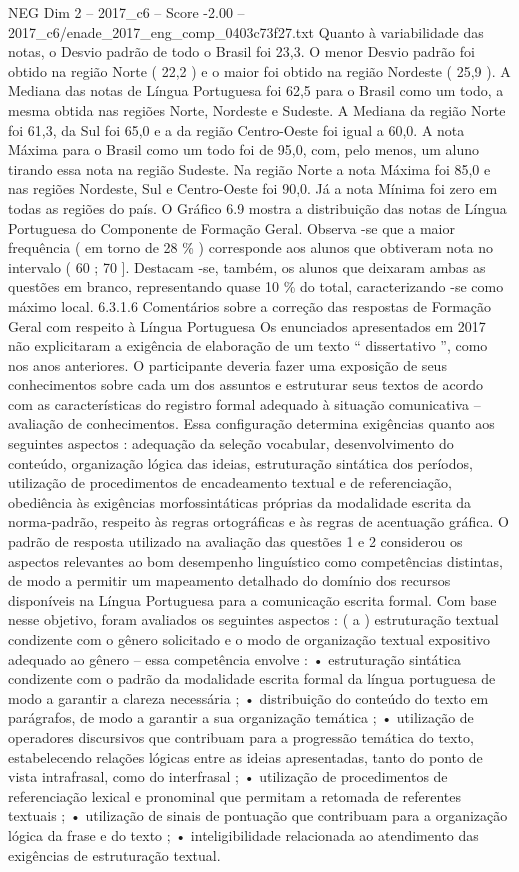 \begin{textsample}{NEG Dim 2 – 2017\_c6 – Score -2.00 – 2017\_c6/enade\_2017\_eng\_comp\_0403c73f27.txt}
Quanto à variabilidade das notas, o Desvio padrão de todo o Brasil foi 23,3.
O menor Desvio padrão foi obtido na região Norte ( 22,2 ) e o maior foi obtido na região Nordeste ( 25,9 ).
A Mediana das notas de Língua Portuguesa foi 62,5 para o Brasil como um todo, a mesma obtida nas regiões Norte, Nordeste e Sudeste.
A Mediana da região Norte foi 61,3, da Sul foi 65,0 e a da região Centro-Oeste foi igual a 60,0.
A nota Máxima para o Brasil como um todo foi de 95,0, com, pelo menos, um aluno tirando essa nota na região Sudeste.
Na região Norte a nota Máxima foi 85,0 e nas regiões Nordeste, Sul e Centro-Oeste foi 90,0.
Já a nota Mínima foi zero em todas as regiões do país.
O Gráfico 6.9 mostra a distribuição das notas de Língua Portuguesa do Componente de Formação Geral.
Observa -se que a maior frequência ( em torno de 28 \% ) corresponde aos alunos que obtiveram nota no intervalo ( 60 ; 70 ].
Destacam -se, também, os alunos que deixaram ambas as questões em branco, representando quase 10 \% do total, caracterizando -se como máximo local. 6.3.1.6 Comentários sobre a correção das respostas de Formação Geral com respeito à Língua Portuguesa Os enunciados apresentados em 2017 não explicitaram a exigência de elaboração de um texto “ dissertativo ”, como nos anos anteriores.
O participante deveria fazer uma exposição de seus conhecimentos sobre cada um dos assuntos e estruturar seus textos de acordo com as características do registro formal adequado à situação comunicativa – avaliação de conhecimentos.
Essa configuração determina exigências quanto aos seguintes aspectos : adequação da seleção vocabular, desenvolvimento do conteúdo, organização lógica das ideias, estruturação sintática dos períodos, utilização de procedimentos de encadeamento textual e de referenciação, obediência às exigências morfossintáticas próprias da modalidade escrita da norma-padrão, respeito às regras ortográficas e às regras de acentuação gráfica.
O padrão de resposta utilizado na avaliação das questões 1 e 2 considerou os aspectos relevantes ao bom desempenho linguístico como competências distintas, de modo a permitir um mapeamento detalhado do domínio dos recursos disponíveis na Língua Portuguesa para a comunicação escrita formal.
Com base nesse objetivo, foram avaliados os seguintes aspectos : ( a ) estruturação textual condizente com o gênero solicitado e o modo de organização textual expositivo adequado ao gênero – essa competência envolve : • estruturação sintática condizente com o padrão da modalidade escrita formal da língua portuguesa de modo a garantir a clareza necessária ; • distribuição do conteúdo do texto em parágrafos, de modo a garantir a sua organização temática ; • utilização de operadores discursivos que contribuam para a progressão temática do texto, estabelecendo relações lógicas entre as ideias apresentadas, tanto do ponto de vista intrafrasal, como do interfrasal ; • utilização de procedimentos de referenciação lexical e pronominal que permitam a retomada de referentes textuais ; • utilização de sinais de pontuação que contribuam para a organização lógica da frase e do texto ; • inteligibilidade relacionada ao atendimento das exigências de estruturação textual.

\end{textsample}
